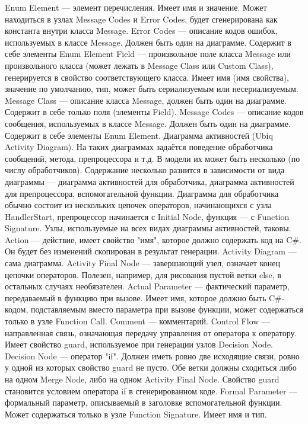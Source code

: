 Enum Element --- элемент перечисления. Имеет имя и значение. Может находиться в узлах Message Codes и Error Codes, будет сгенерирована как константа внутри класса Message.
Error Codes --- описание кодов ошибок, используемых в классе Message. Должен быть один на диаграмме. Содержит в себе элементы Enum Element
Field --- произвольное поле класса Message или произвольного класса (может лежать в Message Class или Custom Class), генерируется в свойство соответствующего класса. Имеет имя (имя свойства), значение по умолчанию, тип, может быть сериализуемым или несериализуемым.
Message Class --- описание класса Message, должен быть один на диаграмме. Содержит в себе только поля (элементы Field).
Message Codes --- описание кодов сообщения, используемых в классе Message. Должен быть один на диаграмме. Содержит в себе элементы Enum Element.
Диаграмма активностей (Ubiq Activity Diagram). На таких диаграммах задаётся поведение обработчика сообщений, метода, препроцессора и т.д. В модели их может быть несколько (по числу обработчиков). Содержание несколько разнится в зависимости от вида диаграммы --- диаграмма активностей для обработчика, диаграмма активностей для препроцессора, вспомогательной функции. Диаграмма для обработчика обычно состоит из нескольких цепочек операторов, начинающихся с узла HandlerStart, препроцессор начинается с Initial Node, функция --- с Function Signature. Узлы, используемые на всех видах диаграммы активностей, таковы.
Action --- действие, имеет свойство "имя", которое должно содержать код на C#. Он будет без изменений скопирован в результат генерации.
Activity Diagram --- сама диаграмма.
Activity Final Node --- завершающий узел, означает конец цепочки операторов. Полезен, например, для рисования пустой ветки else, в остальных случаях необязателен.
Actual Parameter --- фактический параметр, передаваемый в функцию при вызове. Имеет имя, которое должно быть C#-кодом, подставляемым вместо параметра при вызове функции, может содержаться только в узле Function Call.
Comment --- комментарий.
Control Flow --- направленная связь, означающая передачу управления от оператора к оператору. Имеет свойство guard, используемое при генерации узлов Decision Node.
Decision Node --- оператор "if". Должен иметь ровно две исходящие связи, ровно у одной из которых свойство guard не пусто. Обе ветки должны сходиться либо на одном Merge Node, либо на одном Activity Final Node. Свойство guard становится условием оператора if в сгенерированном коде.
Formal Parameter --- формальный параметр, описываемый в заголовке вспомогательной функции. Может содержаться только в узле Function Signature. Имеет имя и тип.
